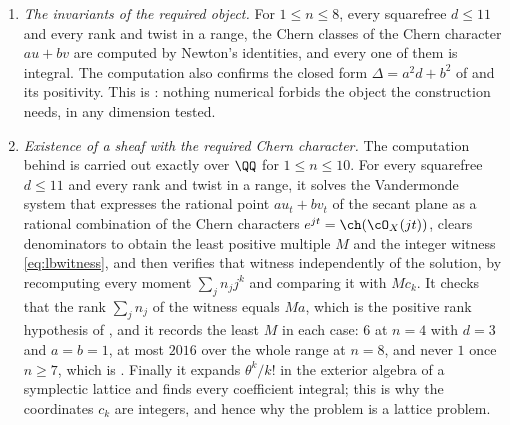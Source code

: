 \begin{enumerate}[label=\textup{(\Roman*)},leftmargin=*]
\item \emph{The invariants of the required object.} For $1\le n\le8$, every
  squarefree $d\le11$ and every rank and twist in a range, the Chern classes
  of the Chern character $au+bv$ are computed by Newton's identities, and
  every one of them is integral. The computation also confirms the closed
  form $\Delta=a^{2}d+b^{2}$ of  and its
  positivity. This is : nothing numerical forbids the
  object the construction needs, in any dimension tested.

\item \emph{Existence of a sheaf with the required Chern character.} The
  computation behind  is carried out exactly over
  $\QQ$ for $1\le n\le10$. For every squarefree $d\le11$ and every rank and
  twist in a range, it solves the Vandermonde system that expresses the
  rational point $au_{t}+bv_{t}$ of the secant plane as a rational
  combination of the Chern characters $e^{jt}=\ch(\cO_{X}(jt))$, clears
  denominators to obtain the least positive multiple $M$ and the integer
  witness \eqref{eq:lbwitness}, and then verifies that witness independently
  of the solution, by recomputing every moment $\sum_{j}n_{j}j^{k}$ and
  comparing it with $Mc_{k}$. It checks that the rank $\sum_{j}n_{j}$ of the
  witness equals $Ma$, which is the positive rank hypothesis of
  , and it records the least $M$ in each case: $6$ at $n=4$
  with $d=3$ and $a=b=1$, at most $2016$ over the whole range at $n=8$, and
  never $1$ once $n\ge7$, which is . Finally it expands
  $\theta^{k}/k!$ in the exterior algebra of a symplectic lattice and finds
  every coefficient integral; this is why the coordinates $c_{k}$ are
  integers, and hence why the problem is a lattice problem.


\end{enumerate}
